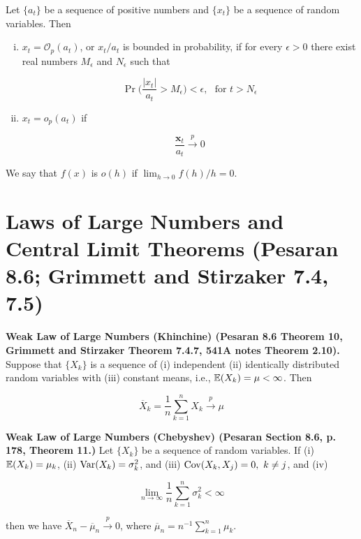 \begin{definition} Let \(\{a_t\}\) be a sequence of positive numbers and \(\{x_t\}\) be a sequence of random variables. Then

\begin{enumerate}[(i)]

\item \(x_t = \mathcal{O}_p(a_t)\), or \(x_t/a_t\) is bounded in probability, if for every \(\epsilon > 0\) there exist real numbers \(M_\epsilon\) and \(N_\epsilon\) such that

\[
\Pr \bigg( \frac{|x_t|}{a_t} > M_\epsilon \bigg) < \epsilon, \ \ \ \text{for } t > N_\epsilon
\]

\item \(x_t = o_p(a_t)\) if

\[
\frac{\boldsymbol{x}_t}{a_t} \xrightarrow{p} 0
\]

\end{enumerate}
\end{definition}

\begin{definition} We say that \(f(x)\) is \(o(h)\) if \(\lim_{h \to 0} f(h)/h =0\).

\end{definition}

\section{Laws of Large Numbers and Central Limit Theorems (Pesaran 8.6; Grimmett and Stirzaker 7.4, 7.5)}

\begin{theorem}\label{asym.wlln} \textbf{Weak Law of Large Numbers (Khinchine) (Pesaran 8.6 Theorem 10, Grimmett and Stirzaker Theorem 7.4.7, 541A notes Theorem 2.10).} Suppose that \(\{X_k\}\) is a sequence of (i) independent (ii) identically distributed random variables with (iii) constant means, i.e., \(\mathbb{E}(X_k) = \mu < \infty\). Then

\[
\overline{X}_k = \frac{1}{n} \sum_{k=1}^n X_k \xrightarrow{p} \mu
\]

\end{theorem}

\begin{theorem}\textbf{Weak Law of Large Numbers (Chebyshev) (Pesaran Section 8.6, p. 178, Theorem 11.)} Let \(\{X_k\}\) be a sequence of random variables. If (i) \(\mathbb{E}(X_k) = \mu_k\), (ii) \(\mathrm{Var}(X_k) = \sigma_k^2\), and (iii) \(\mathrm{Cov}(X_k, X_j) = 0, \ k \neq j\), and (iv)

\[
\lim_{n \to \infty} \frac{1}{n} \sum_{k=1}^n \sigma_k^2 < \infty
\]

then we have \(\overline{X}_n - \overline{\mu}_n \xrightarrow{p} 0\), where \( \overline{\mu}_n = n^{-1} \sum_{k=1}^n \mu_k\).\end{theorem}

